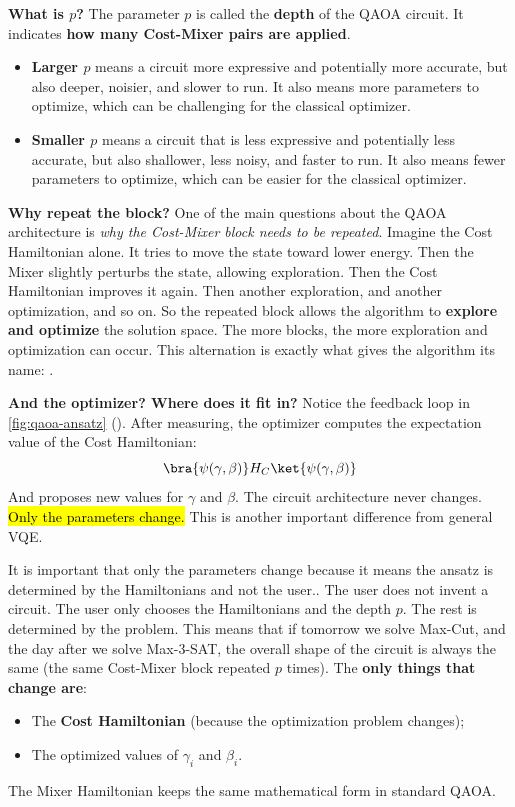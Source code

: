 \highspace
\textcolor{Green3}{ \textbf{What is $p$?}} The parameter $p$ is called the \textbf{depth} of the QAOA circuit. It indicates \textbf{how many Cost-Mixer pairs are applied}.
\begin{itemize}
    \item \textbf{Larger $p$} means a circuit more expressive and potentially more accurate, but also deeper, noisier, and slower to run. It also means more parameters to optimize, which can be challenging for the classical optimizer.
    \item \textbf{Smaller $p$} means a circuit that is less expressive and potentially less accurate, but also shallower, less noisy, and faster to run. It also means fewer parameters to optimize, which can be easier for the classical optimizer.
\end{itemize}

\highspace
\textcolor{Green3}{ \textbf{Why repeat the block?}} One of the main questions about the QAOA architecture is \emph{why the Cost-Mixer block needs to be repeated}. Imagine the Cost Hamiltonian alone. It tries to move the state toward lower energy. Then the Mixer slightly perturbs the state, allowing exploration. Then the Cost Hamiltonian improves it again. Then another exploration, and another optimization, and so on. So the repeated block allows the algorithm to \textbf{explore and optimize} the solution space. The more blocks, the more exploration and optimization can occur. This alternation is exactly what gives the algorithm its name: .

\highspace
\textcolor{Green3}{ \textbf{And the optimizer? Where does it fit in?}} Notice the feedback loop in \autoref{fig:qaoa-ansatz} (). After measuring, the optimizer computes the expectation value of the Cost Hamiltonian:
\begin{equation*}
    \bra{\psi(\gamma,\beta)} H_C \ket{\psi(\gamma,\beta)}
\end{equation*}
And proposes new values for $\gamma$ and $\beta$. The circuit architecture never changes. \hl{Only the parameters change.} This is another important difference from general VQE.

\highspace
It is important that only the parameters change because it means the ansatz is determined by the Hamiltonians and not the user.. The user does not invent a circuit. The user only chooses the Hamiltonians and the depth $p$. The rest is determined by the problem. This means that if tomorrow we solve Max-Cut, and the day after we solve Max-3-SAT, the overall shape of the circuit is always the same (the same Cost-Mixer block repeated $p$ times). The \textbf{only things that change are}:
\begin{itemize}
    \item The \textbf{Cost Hamiltonian} (because the optimization problem changes);
    \item The optimized values of $\gamma_i$ and $\beta_i$.
\end{itemize}
The Mixer Hamiltonian keeps the same mathematical form in standard QAOA.

